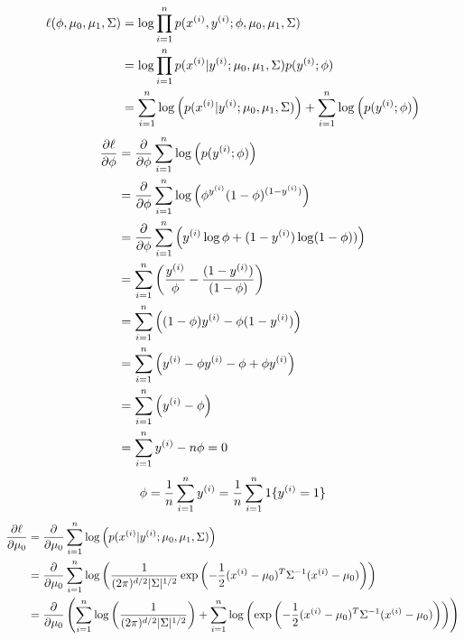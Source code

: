 \begin{answer}
  \begin{align*}
\ell(\phi, \mu_{0}, \mu_1, \Sigma) &= \log \prod_{i=1}^{n} p(x^{(i)} , y^{(i)};\phi, \mu_{0}, \mu_1, \Sigma) \\
&= \log \prod_{i=1}^{n} p(x^{(i)} | y^{(i)}; \mu_{0}, \mu_1, \Sigma) p(y^{(i)};\phi) \\
&= \sum_{i=1}^{n} \log \left( p(x^{(i)} | y^{(i)}; \mu_{0}, \mu_1, \Sigma) \right) + \sum_{i=1}^{n} \log\left( p(y^{(i)};\phi)\right)
  \end{align*}
  \begin{align*}
\frac{\partial\ell}{\partial\phi}&=\frac{\partial}{\partial\phi}\sum_{i=1}^{n} \log \left( p(y^{(i)};\phi)\right)\\
&=\frac{\partial}{\partial\phi}\sum_{i=1}^{n} \log \left(\phi^{y^{(i)}} (1-\phi)^{(1-y^{(i)})} \right)\\
&=\frac{\partial}{\partial\phi}\sum_{i=1}^{n} \left( y^{(i)}\log \phi+(1-y^{(i)})\log (1-\phi) ) \right)\\
&=\sum_{i=1}^{n} \left( \frac{y^{(i)}}{\phi}-\frac{(1-y^{(i)})}{(1-\phi)}  \right)\\
&=\sum_{i=1}^{n} \left( (1-\phi)y^{(i)}-\phi(1-y^{(i)})  \right)\\
&=\sum_{i=1}^{n} \left( y^{(i)}-\phi y^{(i)}-\phi+\phi y^{(i)}  \right)\\
&=\sum_{i=1}^{n} \left( y^{(i)}-\phi \right)\\
&=\sum_{i=1}^{n} y^{(i)}-{n}\phi=0
  \end{align*}
  \begin{align*}
\phi=\frac{1}{{n}}\sum_{i=1}^{n} y^{(i)}=\frac{1}{{n}} \sum_{i=1}^{n} 1\{y^{(i)} = 1\}
  \end{align*}
  \begin{align*}
\frac{\partial\ell}{\partial\mu_{0}}&=\frac{\partial}{\partial\mu_{0}}\sum_{i=1}^\nexp \log \left( p(x^{(i)} | y^{(i)}; \mu_{0}, \mu_1, \Sigma) \right)\\
&=\frac{\partial}{\partial\mu_{0}}\sum_{i=1}^\nexp \log \left(\frac{1}{(2\pi)^{\di/2} |\Sigma|^{1/2}}\exp\left(-\frac{1}{2}(x^{(i)}-\mu_{0})^T \Sigma^{-1} (x^{(i)}-\mu_{0})\right) \right)\\
&=\frac{\partial}{\partial\mu_{0}}\left(\sum_{i=1}^\nexp \log \left(\frac{1}{(2\pi)^{\di/2} |\Sigma|^{1/2}}\right)+\sum_{i=1}^\nexp \log\left(\exp\left(-\frac{1}{2}(x^{(i)}-\mu_{0})^T \Sigma^{-1} (x^{(i)}-\mu_{0})\right) \right)\right)\\

\end{align*}
\end{answer}

